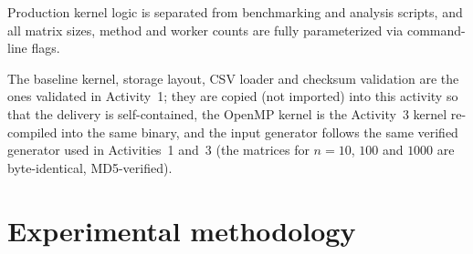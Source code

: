 \documentclass[12pt,a4paper]{article}
\begin{document}
Production kernel logic is separated from benchmarking and analysis
scripts, and all matrix sizes, method and worker counts are fully
parameterized via command-line flags.

The baseline kernel, storage layout, CSV loader and checksum validation are
the ones validated in Activity~1; they are copied (not imported) into this
activity so that the delivery is self-contained, the OpenMP kernel is the
Activity~3 kernel re-compiled into the same binary, and the input generator
follows the same verified generator used in Activities~1 and~3 (the matrices
for $n = 10$, $100$ and $1000$ are byte-identical, MD5-verified).

\section{Experimental methodology}
\label{sec:method}
\end{document}
